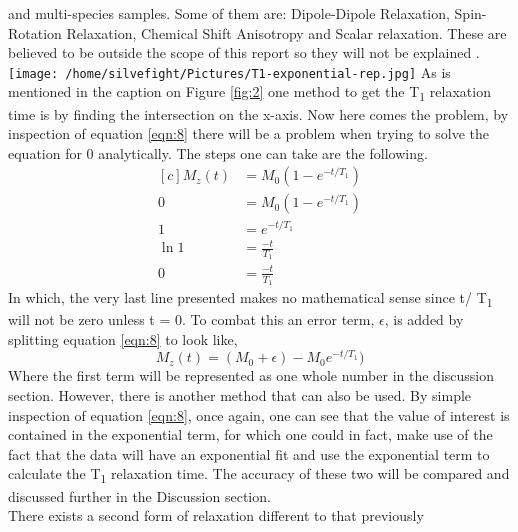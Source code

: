 \documentclass{article}
\begin{document}
{\begin{multicols}{2}
and multi-species samples. Some of them are: Dipole-Dipole Relaxation, 
Spin-Rotation Relaxation, Chemical Shift Anisotropy and Scalar relaxation. 
These are believed to be outside the scope of this report so they will not be 
explained \cite{ref:1}.
\center
\texttt{[image: /home/silvefight/Pictures/T1-exponential-rep.jpg]}
\label{fig:2}
\justify
As is mentioned in the caption on Figure \ref{fig:2} one method to get the 
T\textsubscript{1} relaxation time is by finding the intersection on the 
x-axis. Now here comes the problem, by inspection of equation \ref{eqn:8} there 
will be a problem when trying to solve the equation for 0 analytically. The 
steps one can take are the following.
\begin{equation*}
\begin{aligned}[c] 
M_z (t) &= M_0 (1-e^{-t/T_1}) \\
0 &= M_0 (1-e^{-t/T_1}) \\
1 &= e^{-t/T_1} \\
\ln{1} &= \frac{-t}{T_1} \\
0 &= \frac{-t}{T_1}
\end{aligned}
\end{equation*}
In which, the very last line presented makes no mathematical sense since t/
T\textsubscript{1} will not be zero unless t = 0. To combat this an error term, 
$\epsilon$, is added by splitting equation \ref{eqn:8} to look like,
\begin{equation}
M_z (t) = (M_0 + \epsilon) -M_0 e^{-t/T_1})
\label{eqn:9}
\end{equation}
Where the first term will be represented as one whole number in the discussion 
section. However, there is another method that can also be used. By simple 
inspection of equation \ref{eqn:8}, once again, one can see that the value of 
interest is contained in the exponential term, for which one could in fact, 
make use of the fact that the data will have an exponential fit and use the 
exponential term to calculate the T\textsubscript{1} relaxation time. The 
accuracy of these two will be compared and discussed further in the Discussion 
section.
\\
There exists a second form of relaxation different to that previously 

\end{multicols}}
\end{document}
